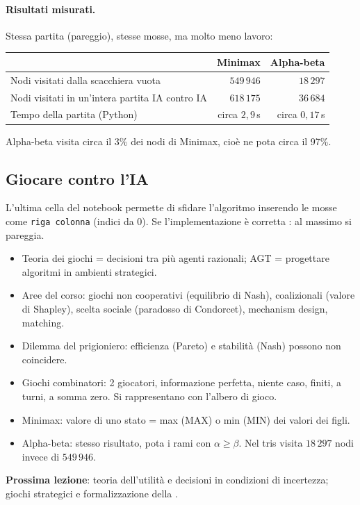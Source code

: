 \paragraph{Risultati misurati.}
Stessa partita (pareggio), stesse mosse, ma molto meno lavoro:

\begin{center}
\renewcommand{\arraystretch}{1.2}
\begin{tabular}{lrr}
\toprule
 & Minimax & Alpha-beta \\
\midrule
Nodi visitati dalla scacchiera vuota & $549\,946$ & $18\,297$ \\
Nodi visitati in un'intera partita IA contro IA & $618\,175$ & $36\,684$ \\
Tempo della partita (Python) & circa $2{,}9$\,s & circa $0{,}17$\,s \\
\bottomrule
\end{tabular}
\end{center}

Alpha-beta visita circa il 3\% dei nodi di Minimax, cioè ne pota circa il 97\%.

\subsection{Giocare contro l'IA}

L'ultima cella del notebook permette di sfidare l'algoritmo inserendo le mosse come
\texttt{riga colonna} (indici da 0). Se l'implementazione è corretta :
al massimo si pareggia.

\begin{riepilogo}
\begin{itemize}
  \item Teoria dei giochi = decisioni tra più agenti razionali; AGT = progettare algoritmi
        in ambienti strategici.
  \item Aree del corso: giochi non cooperativi (equilibrio di Nash), coalizionali (valore di
        Shapley), scelta sociale (paradosso di Condorcet), mechanism design, matching.
  \item Dilemma del prigioniero: efficienza (Pareto) e stabilità (Nash) possono non coincidere.
  \item Giochi combinatori: 2 giocatori, informazione perfetta, niente caso, finiti, a turni,
        a somma zero. Si rappresentano con l'albero di gioco.
  \item Minimax: valore di uno stato = max (MAX) o min (MIN) dei valori dei figli.
  \item Alpha-beta: stesso risultato, pota i rami con $\alpha \ge \beta$. Nel tris visita
        $18\,297$ nodi invece di $549\,946$.
\end{itemize}
\textbf{Prossima lezione}: teoria dell'utilità e decisioni in condizioni di incertezza;
giochi strategici e formalizzazione della .
\end{riepilogo}
